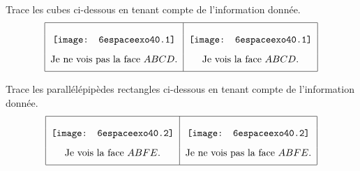\begin{myenumerate}
\item Trace les cubes ci-dessous en tenant compte de l'information donnée.
\[\begin{tabular}{|c|c|}
    \hline &\\
      \texttt{[image: 6espaceexo40.1]}   
       & \texttt{[image: 6espaceexo40.1]} \\[0.3cm]
    Je ne vois pas la face $ABCD$. & Je vois la face $ABCD$. \\[0.2cm]
   \hline
\end{tabular}\]
\vspace{0.3cm}

\item Trace les parallélépipèdes rectangles ci-dessous en tenant compte de l'information donnée.  
\[\begin{tabular}{|c|c|}
    \hline &\\   
     \texttt{[image: 6espaceexo40.2]} 
      & \texttt{[image: 6espaceexo40.2]} \\[0.3cm]
     Je vois la face $ABFE$. & Je ne vois pas la face $ABFE$. \\[0.2cm]
   \hline
\end{tabular}\]
\end{myenumerate}









